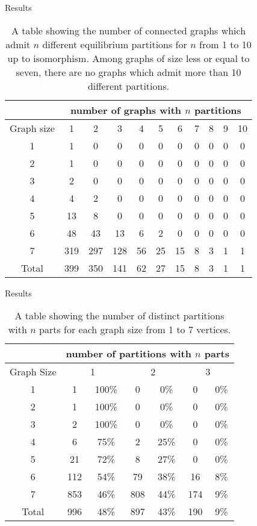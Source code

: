 \documentclass{beamer}
\begin{document}
\begin{frame}{Results}
	\begin{table}[]
		\centering
		\begin{tabular}{c|cccccccccc}
			&\multicolumn{10}{|c}{number of graphs with $n$ partitions}  \\
			\hline 
			Graph size&1&2&3&4&5&6&7&8&9&10\\
			\hline 
			1&1&0&0&0&0&0&0&0&0&0\\
			2&1&0&0&0&0&0&0&0&0&0\\
			3&2&0&0&0&0&0&0&0&0&0\\
			4&4&2&0&0&0&0&0&0&0&0\\
			5&13&8&0&0&0&0&0&0&0&0\\
			6&48&43&13&6&2&0&0&0&0&0\\
			7&319&297&128&56&25&15&8&3&1&1\\
			\hline
			Total&399&350&141&62&27&15&8&3&1&1
		\end{tabular}
		\caption{A table showing the number of connected graphs which admit $n$ different equilibrium partitions for $n$ from 1 to 10 up to isomorphism. Among graphs of size less or equal to seven, there are no graphs which admit more than 10 different partitions.}
		\label{tab:CountPartitionNumber}
	\end{table}
\end{frame}

\begin{frame}{Results}
	\begin{table}[h!]
		\centering
		\begin{tabular}{c|cccccc}
			& \multicolumn{6}{|c}{number of partitions with $n$ parts} \\
			\hline 
			Graph Size&\multicolumn{2}{|c}{1}&\multicolumn{2}{c}{2}&\multicolumn{2}{c}{3}\\
			\hline 
			1&1&100\%&0&0\%&0&0\%\\
			2&1&100\%&0&0\%&0&0\%\\
			3&2&100\%&0&0\%&0&0\%\\
			4&6&75\%&2&25\%&0&0\%\\
			5&21&72\%&8&27\%&0&0\%\\
			6&112&54\%&79&38\%&16&8\%\\
			7&853&46\%&808&44\%&174&9\%\\
			\hline
			Total& 996&48\%&897&43\%&190&9\%
		\end{tabular}
		\caption{A table showing the number of distinct partitions with $n$ parts for each graph size from 1 to 7 vertices. }
		\label{NumberClusters}
	\end{table}
\end{frame}
\end{document}
